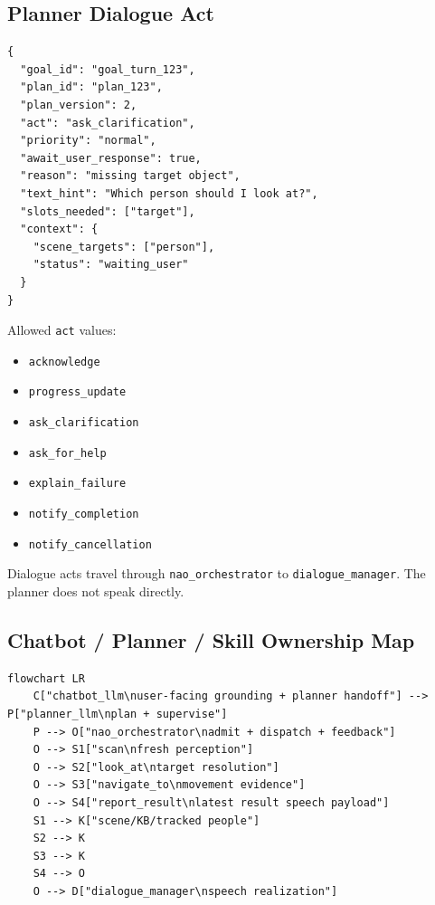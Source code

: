 \documentclass[12pt,a4paper]{article}
\newcommand{\code}[1]{\texttt{#1}}
\begin{document}
\subsection{Planner Dialogue Act}

\begin{lstlisting}
{
  "goal_id": "goal_turn_123",
  "plan_id": "plan_123",
  "plan_version": 2,
  "act": "ask_clarification",
  "priority": "normal",
  "await_user_response": true,
  "reason": "missing target object",
  "text_hint": "Which person should I look at?",
  "slots_needed": ["target"],
  "context": {
    "scene_targets": ["person"],
    "status": "waiting_user"
  }
}
\end{lstlisting}

Allowed \code{act} values:

\begin{itemize}
\item \code{acknowledge}
\item \code{progress\_update}
\item \code{ask\_clarification}
\item \code{ask\_for\_help}
\item \code{explain\_failure}
\item \code{notify\_completion}
\item \code{notify\_cancellation}
\end{itemize}

Dialogue acts travel through \code{nao\_orchestrator} to \code{dialogue\_manager}. The planner does not speak directly.



\subsection{Chatbot / Planner / Skill Ownership Map}

\begin{lstlisting}[caption={Diagram source from canonical Markdown}]
flowchart LR
    C["chatbot_llm\nuser-facing grounding + planner handoff"] --> P["planner_llm\nplan + supervise"]
    P --> O["nao_orchestrator\nadmit + dispatch + feedback"]
    O --> S1["scan\nfresh perception"]
    O --> S2["look_at\ntarget resolution"]
    O --> S3["navigate_to\nmovement evidence"]
    O --> S4["report_result\nlatest result speech payload"]
    S1 --> K["scene/KB/tracked people"]
    S2 --> K
    S3 --> K
    S4 --> O
    O --> D["dialogue_manager\nspeech realization"]
\end{lstlisting}
\end{document}
